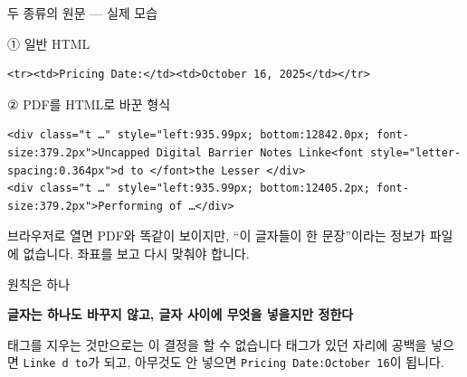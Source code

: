 \begin{frame}[fragile]{두 종류의 원문 — 실제 모습}
\begin{block}{① 일반 HTML}
\begin{Verbatim}
<tr><td>Pricing Date:</td><td>October 16, 2025</td></tr>
\end{Verbatim}
\end{block}
\begin{block}{② PDF를 HTML로 바꾼 형식}
\begin{Verbatim}
<div class="t …" style="left:935.99px; bottom:12842.0px; font-size:379.2px">Uncapped Digital Barrier Notes Linke<font style="letter-spacing:0.364px">d to </font>the Lesser </div>
<div class="t …" style="left:935.99px; bottom:12405.2px; font-size:379.2px">Performing of …</div>
\end{Verbatim}
\end{block}
\small 브라우저로 열면 PDF와 똑같이 보이지만, \alert{``이 글자들이 한 문장''이라는 정보가 파일에 없습니다}. 좌표를 보고 다시 맞춰야 합니다.

\vspace{0.3em}
\end{frame}

\begin{frame}{원칙은 하나}
\begin{center}
\large \textbf{글자는 하나도 바꾸지 않고, 글자 사이에 무엇을 넣을지만 정한다}
\end{center}
\vspace{0.2em}
\centering
{}
\vspace{0.6em}

\raggedright
\begin{alertblock}{태그를 지우는 것만으로는 이 결정을 할 수 없습니다}
태그가 있던 자리에 공백을 넣으면 \texttt{Linke d to}가 되고,
아무것도 안 넣으면 \texttt{Pricing Date:October 16}이 됩니다.
\end{alertblock}
\end{frame}


